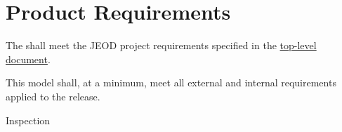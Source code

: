 %
%
%
%

\chapter{Product Requirements}
\label{ch:reqt}


\label{reqt:toplevel}
\begin{description:}
\item[Requirement]
  The \MODELTITLEx shall meet the JEOD project requirements specified in
  the \JEODidx \hyperref{file:\JEODHOME/docs/JEOD.pdf}{part1}{reqt}
  {top-level document}.
\item[Rationale]
  This model shall, at a minimum, meet all external and
  internal requirements applied to the \JEODidx release.
\item[Verification]
  Inspection 
\end{description:}


%
